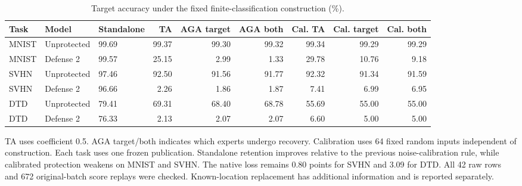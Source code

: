 \begin{table}[t]
\centering\small
\caption{Target accuracy under the fixed finite-classification construction (\%).}
\label{tab:finite-classification-targets}
\begin{tabular}{lllrrrrrr}
\toprule
Task & Model & Standalone & TA & AGA target & AGA both & Cal. TA & Cal. target & Cal. both \\
\midrule
MNIST & Unprotected & 99.69 & 99.37 & 99.30 & 99.32 & 99.34 & 99.29 & 99.29 \\
MNIST & Defense 2 & 99.57 & 25.15 & 2.99 & 1.33 & 29.78 & 10.76 & 9.18 \\
SVHN & Unprotected & 97.46 & 92.50 & 91.56 & 91.77 & 92.32 & 91.34 & 91.59 \\
SVHN & Defense 2 & 96.66 & 2.26 & 1.86 & 1.87 & 7.41 & 6.99 & 6.95 \\
DTD & Unprotected & 79.41 & 69.31 & 68.40 & 68.78 & 55.69 & 55.00 & 55.00 \\
DTD & Defense 2 & 76.33 & 2.13 & 2.07 & 2.07 & 6.60 & 5.00 & 5.00 \\
\bottomrule
\end{tabular}
\par\smallskip
\begin{minipage}{\textwidth}\footnotesize
TA uses coefficient 0.5. AGA target/both indicates which experts undergo recovery. Calibration uses 64 fixed random inputs independent of construction. Each task uses one frozen publication. Standalone retention improves relative to the previous noise-calibration rule, while calibrated protection weakens on MNIST and SVHN. The native loss remains 0.80 points for SVHN and 3.09 for DTD. All 42 raw rows and 672 original-batch score replays were checked. Known-location replacement has additional information and is reported separately.
\end{minipage}
\end{table}

